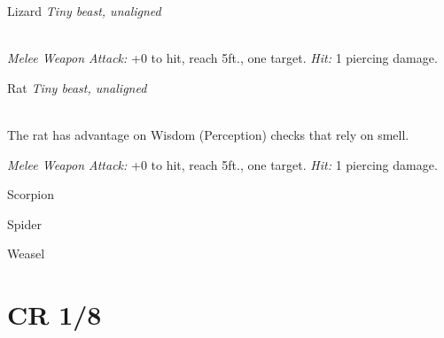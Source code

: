 \documentclass[10pt,twoside,twocolumn,openany]{book}
\begin{document}
\begin{monsterboxnobg}{Lizard}
	\textit{Tiny beast, unaligned}\\
	\hline
	\basics[
		armorclass	= 10,
		hitpoints 		= 2 (1d4),
		speed		= {20 ft., climb 20 ft.}
	]
	\hline
	\stats[
		STR	= \stat{2},
		DEX	= \stat{11},
		CON	= \stat{10},
		INT	= \stat{1},
		WIS	= \stat{8},
		CHA	= \stat{3}
	]
	\hline
	\details[
		skills			= {},
		senses		= {darkvision 30 ft., passive Perception 9},
		languages		= {-},
		challenge		= 0
	]
	\hline \\[1mm]
	\begin{monsteraction}[Bite]
		\textit{Melee Weapon Attack:} +0 to hit, reach 5ft., one target. \textit{Hit:} 1 piercing damage.
	\end{monsteraction}
\end{monsterboxnobg}

\begin{monsterboxnobg}{Rat}
	\textit{Tiny beast, unaligned}\\
	\hline
	\basics[
		armorclass	= 10,
		hitpoints 		= 1 (1d4 - 1),
		speed		= {20 ft.}
	]
	\hline
	\stats[
		STR	= \stat{2},
		DEX	= \stat{11},
		CON	= \stat{9},
		INT	= \stat{2},
		WIS	= \stat{10},
		CHA	= \stat{4}
	]
	\hline
	\details[
		skills			= {},
		senses 		= {darkvision 30 ft., passive Perception 13},
		languages		= {-},
		challenge		= 0
	]
	\hline \\[1mm]
	\begin{monsteraction}
		The rat has advantage on Wisdom (Perception) checks that rely on smell.
	\end{monsteraction}
	\begin{monsteraction}[Bite]
		\textit{Melee Weapon Attack:} +0 to hit, reach 5ft., one target. \textit{Hit:} 1 piercing damage.
	\end{monsteraction}
\end{monsterboxnobg}

Scorpion

Spider

Weasel
\newpage
\section{CR 1/8}
\end{document}
